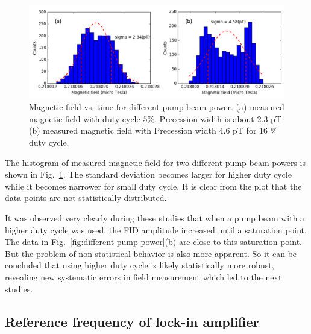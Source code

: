 \begin{figure}
  \centering
  \includegraphics[width=\textwidth]{figures/pump_beam}
  \caption{Magnetic field vs. time for different pump beam power. (a)
    measured magnetic field with duty cycle $5 \%$. Precession width
    is about $2.3$ pT (b) measured magnetic field with Precession
    width $4.6$ pT for 16 $\%$ duty cycle.}
    \label{fig:different pump power}
\end{figure}

The histogram of measured magnetic field for two different pump beam
powers is shown in Fig.~\ref{fig:different pump power}. The standard
deviation becomes larger for higher duty cycle while it becomes
narrower for small duty cycle.  It is clear from the plot that the
data points are not statistically distributed.  

It was observed very clearly during these studies that when a pump
beam with a higher duty cycle was used, the FID amplitude increased
until a saturation point.  The data in Fig.~\ref{fig:different pump
  power}(b) are close to this saturation point.  But the problem of
non-statistical behavior is also more apparent.  So it can be
concluded that using higher duty cycle is likely statistically more
robust, revealing new systematic errors in field measurement which led
to the next studies.

\subsection{Reference frequency of lock-in amplifier}
  
